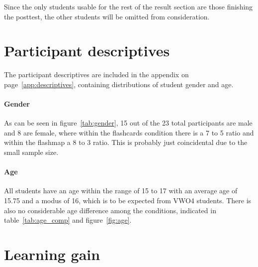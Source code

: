 Since the only students usable for the rest of the result section are those finishing the posttest, the other students will be omitted from consideration.

\section{Participant descriptives}

The participant descriptives are included in the  appendix on page~\ref{app:descriptives}, containing distributions of student gender and age.

\paragraph{Gender} As can be seen in figure~\ref{tab:gender}, 15 out of the 23 total participants are male and 8 are female, where within the flashcards condition there is a 7 to 5 ratio and within the flashmap a 8 to 3 ratio. This is probably just coincidental due to the small sample size.

\paragraph{Age} All students have an age within the range of 15 to 17 with an average age of 15.75 and a modus of 16, which is to be expected from VWO4 students. There is also no considerable age difference among the conditions, indicated in table~\ref{tab:age_comp} and figure~\ref{fig:age}.

\section{Learning gain}

